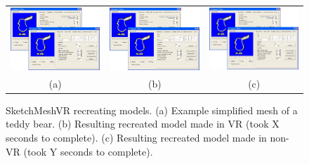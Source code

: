 \begin{figure}[!h]
    \centering
    \setlength{\tabcolsep}{0.0130\linewidth}
    \begin{tabular}{@{}ccc@{}}
    \includegraphics[width=0.3\linewidth]{figures/voldiff_ui}&
  	\includegraphics[width=0.3\linewidth]{figures/voldiff_ui}&
  	\includegraphics[width=0.3\linewidth]{figures/voldiff_ui}\\

    (a)&(b)&(c)\\
    \end{tabular}
    \caption[SketchMeshVR teddy model]{SketchMeshVR recreating models.
    	  \textup{(a)} Example simplified mesh of a teddy bear.
	  \textup{(b)} Resulting recreated model made in VR  (took X seconds to complete).
	  \textup{(c)} Resulting recreated model made in non-VR (took Y seconds to complete).
      \label{fig:recreate_teddy}}
\end{figure}


